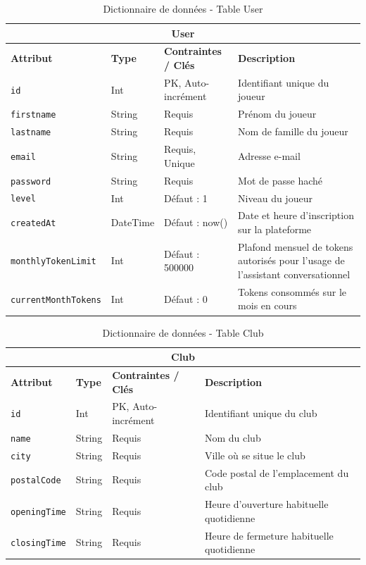 \documentclass[12pt]{article}
\begin{document}
\vspace{0.5cm}
\begin{table}[H]
    \centering
    \begin{tabularx}{\textwidth}{|l|l|l|X|}
    \hline
    \multicolumn{4}{|c|}{\cellcolor[gray]{0.9} \textbf{User}} \\ \hline
    \textbf{Attribut} & \textbf{Type} & \textbf{Contraintes / Clés} & \textbf{Description} \\ \hline
    \texttt{id} & Int & PK, Auto-incrément & Identifiant unique du joueur \\ \hline
    \texttt{firstname} & String & Requis & Prénom du joueur \\ \hline
    \texttt{lastname} & String & Requis & Nom de famille du joueur \\ \hline
    \texttt{email} & String & Requis, Unique & Adresse e-mail \\ \hline
    \texttt{password} & String & Requis & Mot de passe haché \\ \hline
    \texttt{level} & Int & Défaut : 1 & Niveau du joueur \\ \hline
    \texttt{createdAt} & DateTime & Défaut : now() & Date et heure d'inscription sur la plateforme \\ \hline
    \texttt{monthlyTokenLimit} & Int & Défaut : 500000 & Plafond mensuel de tokens autorisés pour l'usage de l'assistant conversationnel \\ \hline
    \texttt{currentMonthTokens} & Int & Défaut : 0 & Tokens consommés sur le mois en cours \\ \hline
    \end{tabularx}
    \caption{Dictionnaire de données - Table User}
    \label{tab:dict_user}
\end{table}

\vspace{0.5cm}
\begin{table}[H]
    \centering
    \begin{tabularx}{\textwidth}{|l|l|l|X|}
    \hline
    \multicolumn{4}{|c|}{\cellcolor[gray]{0.9} \textbf{Club}} \\ \hline
    \textbf{Attribut} & \textbf{Type} & \textbf{Contraintes / Clés} & \textbf{Description} \\ \hline
    \texttt{id} & Int & PK, Auto-incrément & Identifiant unique du club \\ \hline
    \texttt{name} & String & Requis & Nom du club \\ \hline
    \texttt{city} & String & Requis & Ville où se situe le club \\ \hline
    \texttt{postalCode} & String & Requis & Code postal de l'emplacement du club \\ \hline
    \texttt{openingTime} & String & Requis & Heure d'ouverture habituelle quotidienne \\ \hline
    \texttt{closingTime} & String & Requis & Heure de fermeture habituelle quotidienne \\ \hline
    \end{tabularx}
    \caption{Dictionnaire de données - Table Club}
    \label{tab:dict_club}
\end{table}
\end{document}
